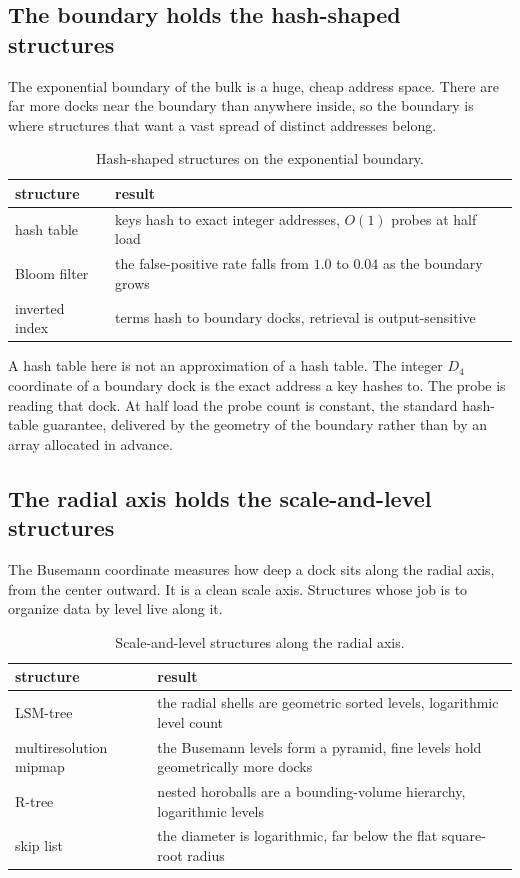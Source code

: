 \subsection{The boundary holds the hash-shaped structures}

The exponential boundary of the bulk is a huge, cheap address space. There are far more docks near the boundary than anywhere inside, so the boundary is where structures that want a vast spread of distinct addresses belong.

\begin{table}[ht]
\centering
\begin{tabular}{@{}ll@{}}
\toprule
structure & result \\
\midrule
hash table & keys hash to exact integer addresses, $O(1)$ probes at half load \\
Bloom filter & the false-positive rate falls from $1.0$ to $0.04$ as the boundary grows \\
inverted index & terms hash to boundary docks, retrieval is output-sensitive \\
\bottomrule
\end{tabular}
\caption{Hash-shaped structures on the exponential boundary.}
\label{tab:hash-structures}
\end{table}

A hash table here is not an approximation of a hash table. The integer $D_4$ coordinate of a boundary dock is the exact address a key hashes to. The probe is reading that dock. At half load the probe count is constant, the standard hash-table guarantee, delivered by the geometry of the boundary rather than by an array allocated in advance.

\subsection{The radial axis holds the scale-and-level structures}

The Busemann coordinate measures how deep a dock sits along the radial axis, from the center outward. It is a clean scale axis. Structures whose job is to organize data by level live along it.

\begin{table}[ht]
\centering
\begin{tabular}{@{}ll@{}}
\toprule
structure & result \\
\midrule
LSM-tree & the radial shells are geometric sorted levels, logarithmic level count \\
multiresolution mipmap & the Busemann levels form a pyramid, fine levels hold geometrically more docks \\
R-tree & nested horoballs are a bounding-volume hierarchy, logarithmic levels \\
skip list & the diameter is logarithmic, far below the flat square-root radius \\
\bottomrule
\end{tabular}
\caption{Scale-and-level structures along the radial axis.}
\label{tab:radial-structures}
\end{table}

